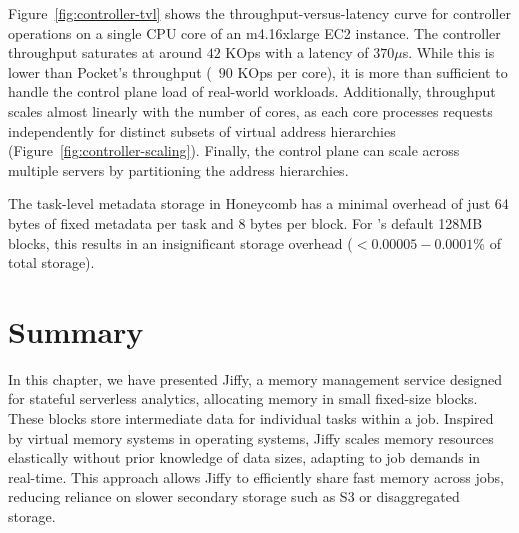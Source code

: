 Figure~\ref{fig:controller-tvl} shows the throughput-versus-latency curve for \jiffy controller operations on a single CPU core of an m4.16xlarge EC2 instance. The controller throughput saturates at around $42$ KOps with a latency of $370\mu$s. While this is lower than Pocket's throughput (~$90$ KOps per core), it is more than sufficient to handle the control plane load of real-world workloads. Additionally, throughput scales almost linearly with the number of cores, as each core processes requests independently for distinct subsets of virtual address hierarchies (Figure~\ref{fig:controller-scaling}). Finally, the control plane can scale across multiple servers by partitioning the address hierarchies.

 The task-level metadata storage in Honeycomb has a minimal overhead of just 64 bytes of fixed metadata per task and 8 bytes per block. For \jiffy's default 128MB blocks, this results in an insignificant storage overhead ($<0.00005-0.0001\%$ of total storage).

\section{Summary}
\label{sec:jiffysummary}
In this chapter, we have presented Jiffy, a memory management service designed for stateful serverless analytics, allocating memory in small fixed-size blocks. These blocks store intermediate data for individual tasks within a job. Inspired by virtual memory systems in operating systems, Jiffy scales memory resources elastically without prior knowledge of data sizes, adapting to job demands in real-time. This approach allows Jiffy to efficiently share fast memory across jobs, reducing reliance on slower secondary storage such as S3 or disaggregated storage.








